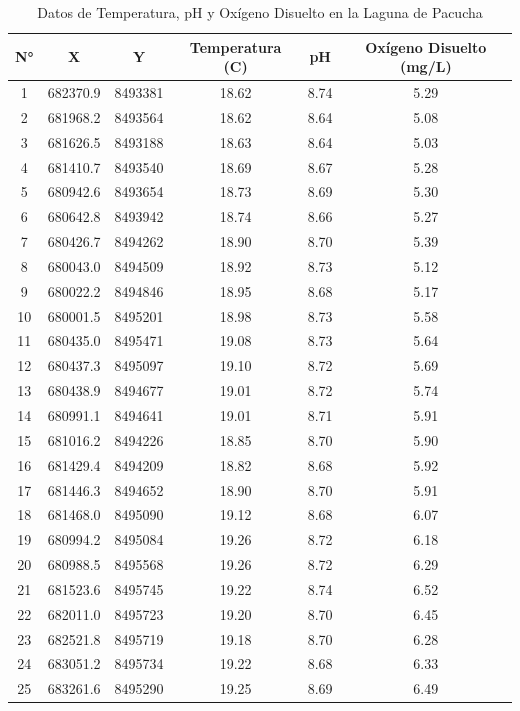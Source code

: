 \begin{table}[!htb]
\centering
\caption{Datos de Temperatura, pH y Oxígeno Disuelto en la Laguna de Pacucha}
\label{my-label1}
\small
\setlength{\tabcolsep}{4pt}
\renewcommand{\arraystretch}{0.9}
\begin{tabular}{@{}cccccc@{}}
\toprule
N° & X & Y & Temperatura (\textdegree{}C) & pH & Oxígeno Disuelto (mg/L) \\ \midrule
1 & 682370.9 & 8493381 & 18.62 & 8.74 & 5.29 \\
2 & 681968.2 & 8493564 & 18.62 & 8.64 & 5.08 \\
3 & 681626.5 & 8493188 & 18.63 & 8.64 & 5.03 \\
4 & 681410.7 & 8493540 & 18.69 & 8.67 & 5.28 \\
5 & 680942.6 & 8493654 & 18.73 & 8.69 & 5.30 \\
6 & 680642.8 & 8493942 & 18.74 & 8.66 & 5.27 \\
7 & 680426.7 & 8494262 & 18.90 & 8.70 & 5.39 \\
8 & 680043.0 & 8494509 & 18.92 & 8.73 & 5.12 \\
9 & 680022.2 & 8494846 & 18.95 & 8.68 & 5.17 \\
10 & 680001.5 & 8495201 & 18.98 & 8.73 & 5.58 \\
11 & 680435.0 & 8495471 & 19.08 & 8.73 & 5.64 \\
12 & 680437.3 & 8495097 & 19.10 & 8.72 & 5.69 \\
13 & 680438.9 & 8494677 & 19.01 & 8.72 & 5.74 \\
14 & 680991.1 & 8494641 & 19.01 & 8.71 & 5.91 \\
15 & 681016.2 & 8494226 & 18.85 & 8.70 & 5.90 \\
16 & 681429.4 & 8494209 & 18.82 & 8.68 & 5.92 \\
17 & 681446.3 & 8494652 & 18.90 & 8.70 & 5.91 \\
18 & 681468.0 & 8495090 & 19.12 & 8.68 & 6.07 \\
19 & 680994.2 & 8495084 & 19.26 & 8.72 & 6.18 \\
20 & 680988.5 & 8495568 & 19.26 & 8.72 & 6.29 \\
21 & 681523.6 & 8495745 & 19.22 & 8.74 & 6.52 \\
22 & 682011.0 & 8495723 & 19.20 & 8.70 & 6.45 \\
23 & 682521.8 & 8495719 & 19.18 & 8.70 & 6.28 \\
24 & 683051.2 & 8495734 & 19.22 & 8.68 & 6.33 \\
25 & 683261.6 & 8495290 & 19.25 & 8.69 & 6.49 \\

\end{tabular}
\end{table}
